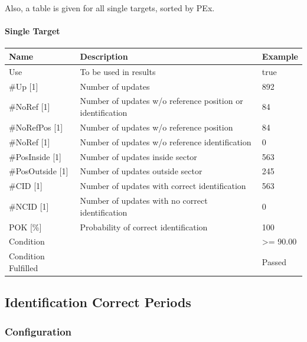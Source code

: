 Also, a table is given for all single targets, sorted by PEx.

\paragraph{Single Target}

\begin{center}
 \begin{table}[H]
  \begin{tabularx}{\textwidth}{ | l | X |  l | }
    \hline
    \textbf{Name} & \textbf{Description} & \textbf{Example} \\ \hline
    Use & To be used in results & true \\ \hline
    \#Up [1] & Number of updates & 892 \\ \hline
    \#NoRef [1] & Number of updates w/o reference position or identification & 84 \\ \hline
    \#NoRefPos [1] & Number of updates w/o reference position  & 84 \\ \hline
    \#NoRef [1] & Number of updates w/o reference identification & 0 \\ \hline
    \#PosInside [1] & Number of updates inside sector & 563 \\ \hline
    \#PosOutside [1] & Number of updates outside sector & 245 \\ \hline
    \#CID [1] & Number of updates with correct identification & 563 \\ \hline
    \#NCID [1] & Number of updates with no correct identification & 0 \\ \hline
    POK [\%] & Probability of correct identification & 100 \\ \hline
    Condition &  & >= 90.00 \\ \hline
    Condition Fulfilled &  & Passed \\ \hline
\end{tabularx}
\end{table}
\end{center}

\subsection{Identification Correct Periods}
\label{sec:eval_req_id_correct_periods} 

\subsubsection{Configuration}

